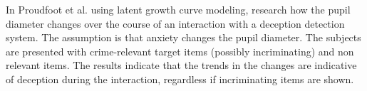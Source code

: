 In \cite{7165946} Proudfoot et al. using latent growth curve modeling, research how the pupil diameter changes over the course of an interaction with a deception detection system. The assumption is that anxiety changes the pupil diameter. The subjects are presented with crime-relevant target items (possibly incriminating) and non relevant items. The results indicate that the trends in the changes are indicative of deception during the interaction, regardless if incriminating items are shown. \\

